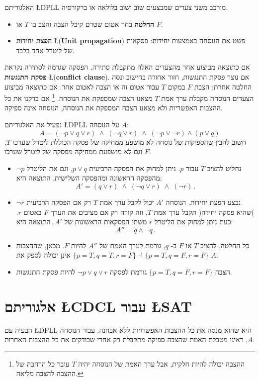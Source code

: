 \documentclass[12pt,a4paper]{article}
\newcommand*{\ngg}{\mathop{\neg}}
\begin{document}
האלגוריתם
\L{DPLL}
מורכב משני צעדים שמבצעים שוב ושוב בלולאה או ברקורסיה.
\begin{itemize}
\item \textbf{החלטה}
בחר אטום שטרם קיבל הצבה והצב בו 
$T$
או
$F$.
\item 
\textbf{הפצת יחידות} 
\L{(\textbf{Unit propagation})} 
פשט את הנוסחה באמצעות
\textbf{יחידות}:
פסקאות של ליטרל אחד בלבד.
\end{itemize}
אם כתוצאה מביצוע אחד מהצעדים האלה מתקבלת סתירה, הפסקה שגרמה לסתירה נקראת
\textbf{פסקת התנגשות}
\L{(\textbf{conflict clause})}.
אם נוצר פסקת התנגשות, חזור אחורה בחישוב ונסה החלטה אחרת: הצבת
$F$
במקום
$T$
עבור אטום זה או הצבה לאטום אחר. אם כתוצאה מביצוע הצעדים הנוסחה מקבלת ערך אמת
$T$
מצאנו הצבה שמספקת את הנוסחה.%
\footnote{%
ההצבה יכולה להיות חלקית, אבל ערך האמת של הנוסחה יהיה 
$T$
עובר כל הרחבה של ההצבה להצבה מליאה.%
}
אם בדקנו את כל ההצבות האפשריות ולא מצאנו הצבה המספקת את הנוסחה, הנוסחה אינה ספיקה.

נפעיל את האלגוריתם
\L{DPLL}
על הנוסחה
$A$:
\[
A=(\ngg p \vee q \vee r) \;\wedge\; (\ngg q \vee r) \;\wedge\; (\ngg p \vee\ngg r) \wedge (p \vee q)
\]
חשוב להבין שהספיקות של נוסחה לא מושפע ממחיקה של פסקה הכוללת ליטרל שערכו
$T$,
וגם לא מושפעת ממחיקה מפסקה של ליטרל שערכו
$F$.
\begin{itemize}
\item
נחליט להציב 
$T$
עבור
$p$.
ניתן למחוק את הפסקה הרביעית
$p \vee q$,
וגם את הליטרל
$\ngg p$
מהפסקה הראשונה ומהפסקה השלישית. התוצאה היא:
\[
A'=(q \vee r) \;\wedge\; (\ngg q \vee r) \;\wedge\; (\ngg r)\,.
\]
\item
נבצע הפצת יחידות. הנוסחה 
$A'$
יכול לקבל ערך אמת
$T$
רק אם הפסקה הרביעית
$\ngg r$
)שהיא פסקה יחידה( תקבל ערך אמת
$T$,
וזה קורה רק אם מציבים את הערך
$F$
באטום
$r$.
כעת ניתן למחוק את הליטרל
$r$
משתי הפסקאות הראשונות של
$A'$.
התוצאה היא:
\[
A'' = q \wedge \ngg q\,.
\]
\item
כל החלטה, להציב
$T$
או
$F$
ב-%
$q$,
גורמת לערך האמת של 
$A''$
להיות
$F$.
מכאן, שההצבות 
$\{p=T, q=F, r=F\}$
ו-%
$\{p=T, q=T, r=F\}$
אינן יכולה לספק את
$A$.
\item
הצבה
$\{p=T, q=F, r=F\}$
גורמת לפסקה
$\ngg p \vee q \vee r$
להיות פסקת התנגשות.
\end{itemize}

\section{אלגוריתם \L{CDCL} עבור \L{SAT}}

הבעיה עם
\L{DPLL}
היא שהוא מנסה את כל ההצבות האפשרויות ללא אבחנה. עבור הנוסחה 
$A$,
ראינו מטבלת האמת שהצבה ספיקה מתקבלת רק אחרי שבודקים את כל ההצבות האחרות.
\end{document}
